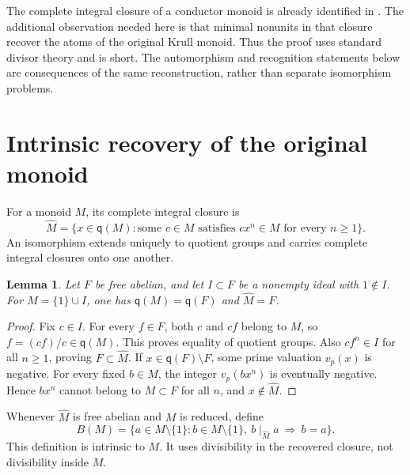 \documentclass[11pt]{article}
\newtheorem{lemma}[theorem]{Lemma}
\theoremstyle{definition}
\newcommand{\q}{\mathsf q}
\begin{document}
The complete integral closure of a conductor monoid is already identified in \cite[Lemmas 3.1--3.2]{GYZ}. The additional observation needed here is that minimal nonunits in that closure recover the atoms of the original Krull monoid. Thus the proof uses standard divisor theory and is short. The automorphism and recognition statements below are consequences of the same reconstruction, rather than separate isomorphism problems.

\section{Intrinsic recovery of the original monoid}

For a monoid $M$, its complete integral closure is
\[
 \widehat M=\{x\in\q(M):\text{some }c\in M\text{ satisfies }cx^n\in M
                 \text{ for every }n\ge1\}.
\]
An isomorphism extends uniquely to quotient groups and carries complete integral closures onto one another.

\begin{lemma}\label{lem:closure}
Let $F$ be free abelian, and let $I\subset F$ be a nonempty ideal with $1\notin I$. For $M=\{1\}\cup I$, one has $\q(M)=\q(F)$ and $\widehat M=F$.
\end{lemma}
\begin{proof}
Fix $c\in I$. For every $f\in F$, both $c$ and $cf$ belong to $M$, so $f=(cf)/c\in\q(M)$. This proves equality of quotient groups. Also $cf^n\in I$ for all $n\ge1$, proving $F\subset\widehat M$. If $x\in\q(F)\setminus F$, some prime valuation $v_p(x)$ is negative. For every fixed $b\in M$, the integer $v_p(bx^n)$ is eventually negative. Hence $bx^n$ cannot belong to $M\subset F$ for all $n$, and $x\notin\widehat M$.
\end{proof}

Whenever $\widehat M$ is free abelian and $M$ is reduced, define
\[
 B(M)=\{a\in M\setminus\{1\}: b\in M\setminus\{1\},\ b\mid_{\widehat M}a
                       \ \Longrightarrow\ b=a\}.
\]
This definition is intrinsic to $M$. It uses divisibility in the recovered closure, not divisibility inside $M$.
\end{document}
